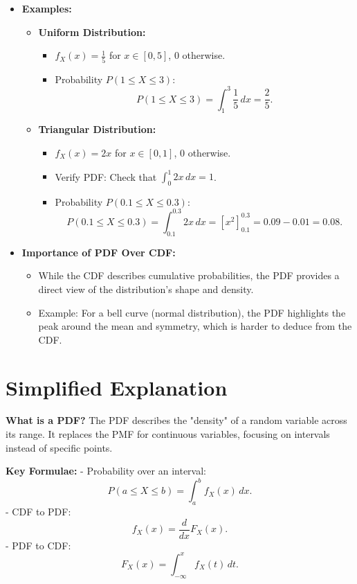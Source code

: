 \documentclass{article}
\begin{document}
\begin{itemize}
  \item \textbf{Examples:}
    \begin{itemize}
      \item \textbf{Uniform Distribution:}
        \begin{itemize}
          \item $f_X(x) = \frac{1}{5}$ for $x \in [0, 5]$, $0$ otherwise.
          \item Probability $P(1 \leq X \leq 3)$:
            \[
              P(1 \leq X \leq 3) = \int_1^3 \frac{1}{5} \, dx = \frac{2}{5}.
            \]
        \end{itemize}

      \item \textbf{Triangular Distribution:}
        \begin{itemize}
          \item $f_X(x) = 2x$ for $x \in [0, 1]$, $0$ otherwise.
          \item Verify PDF: Check that $\int_0^1 2x \, dx = 1$.
          \item Probability $P(0.1 \leq X \leq 0.3)$:
            \[
              P(0.1 \leq X \leq 0.3) = \int_{0.1}^{0.3} 2x \, dx = \left[ x^2 \right]_{0.1}^{0.3} = 0.09 - 0.01 = 0.08.
            \]
        \end{itemize}
    \end{itemize}

  \item \textbf{Importance of PDF Over CDF:}
    \begin{itemize}
      \item While the CDF describes cumulative probabilities, the PDF provides a direct view of the distribution's shape and density.
      \item Example: For a bell curve (normal distribution), the PDF highlights the peak around the mean and symmetry, which is harder to deduce from the CDF.
    \end{itemize}
\end{itemize}

\section*{Simplified Explanation}

\textbf{What is a PDF?}
The PDF describes the "density" of a random variable across its range. It replaces the PMF for continuous variables, focusing on intervals instead of specific points.

\textbf{Key Formulae:}
- Probability over an interval:
\[
  P(a \leq X \leq b) = \int_a^b f_X(x) \, dx.
\]
- CDF to PDF:
\[
  f_X(x) = \frac{d}{dx}F_X(x).
\]
- PDF to CDF:
\[
  F_X(x) = \int_{-\infty}^x f_X(t) \, dt.
\]
\end{document}

